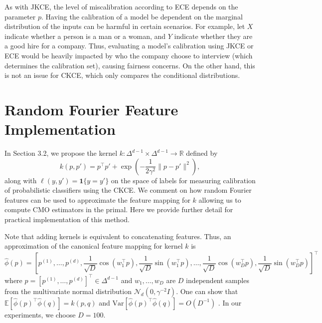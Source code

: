 \documentclass[twocolumn]{article}
\theoremstyle{definition}
\begin{document}
As with JKCE, the level of miscalibration according to ECE depends on the parameter $p$. Having the calibration of a model be dependent on the marginal distribution of the inputs can be harmful in certain scenarios. For example, let $X$ indicate whether a person is a man or a woman, and $Y$ indicate whether they are a good hire for a company. Thus, evaluating a model's calibration using JKCE or ECE would be heavily impacted by who the company choose to interview (which determines the calibration set), causing fairness concerns. On the other hand, this is not an issue for CKCE, which only compares the conditional distributions. 



\section{Random Fourier Feature Implementation} \label{Ap:rff}

In Section 3.2, we propose the kernel $k: \Delta^{d-1} \times \Delta^{d-1} \to \mathbb{R}$ defined by
\begin{equation*}
    k(p,p') = p^\top p' + \exp\left( -\frac{1}{2 \gamma^2} \| p - p' \|^2 \right),
\end{equation*}
along with $\ell(y,y') = \mathbf{1}\{ y = y'\}$ on the space of labels for measuring calibration of probabilistic classifiers using the CKCE. We comment on how random Fourier features can be used to approximate the feature mapping for $k$ allowing us to compute CMO estimators in the primal. Here we provide further detail for practical implementation of this method. 

Note that adding kernels is equivalent to concatenating features. Thus, an approximation of the canonical feature mapping for kernel $k$ is 
\begin{equation*}
    \hat \phi(p) = \left[p^{(1)}, \dots, p^{(d)}, \frac{1}{\sqrt{D}} \cos ( w_1^\top p), \frac{1}{\sqrt{D}} \sin ( w_1^\top p ), \dots, \frac{1}{\sqrt{D}} \cos (w_D^\top p), \frac{1}{\sqrt{D}} \sin (w_D^\top p) \right]^\top
\end{equation*}
where $p = [p^{(1)}, \dots, p^{(d)}]^\top \in \Delta^{d-1}$ and $w_1, \dots, w_D$ are $D$ independent samples from the multivariate normal distribution $\mathcal{N}_d(0, \gamma^{-2} I)$. One can show that $\mathbb{E}[ \hat \phi(p)^\top \hat \phi(q)] = k(p, q)$ and $\text{Var}[ \hat \phi(p)^\top \hat\phi(q)] = O(D^{-1})$ \citep{rahimiRandomFeaturesLargescale2007}. In our experiments, we choose $D=100$. 
\end{document}
